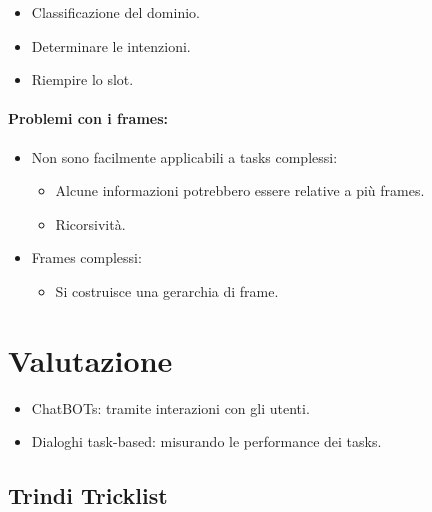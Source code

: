 \begin{itemize}
  \item Classificazione del dominio. 
  \item Determinare le intenzioni. 
  \item Riempire lo slot.
\end{itemize}

\paragraph{Problemi con i frames:}

\begin{itemize}
  \item Non sono facilmente applicabili a tasks complessi: 
    \begin{itemize}
      \item Alcune informazioni potrebbero essere relative a più frames. 
      \item Ricorsività. 
    \end{itemize}
  \item Frames complessi: 
    \begin{itemize}
      \item Si costruisce una gerarchia di frame. 
    \end{itemize}
\end{itemize}


\section{Valutazione}


\begin{itemize}
  \item ChatBOTs: tramite interazioni con gli utenti. 
  \item Dialoghi task-based: misurando le performance dei tasks.
\end{itemize}

\subsection{Trindi Tricklist}

